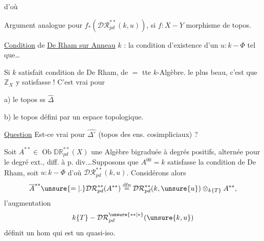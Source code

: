 
d'où

Argument analogue pour $f_*(\mathcal{DR}_{pd}^{**}(k,u))$, si $f:X\mathbin{-}Y$ morphisme de topos.

\uline{Condition} de \uline{De Rham sur Anneau} $k$ : la condition d'existence d'un $u:k\mathbin{-}\Phi$ tel que\ldots

Si $k$ satisfait condition de De Rham, de $=$ tte $k$-Algèbre.  le plus beau, c'est que $\mathbb Z_X$ y satisfasse ! C'est vrai pour

a) le topos ss $\widehat\Delta$

b) le topos défini par un espace topologique. 

\uline{Question} Est-ce vrai pour $\widehat{\Delta^\circ}$ (topos des ens. cosimpliciaux) ? 

Soit $A^{**}\in\operatorname{Ob}\mathbb{DR}_{pd}^{**}(X)$ une Algèbre bigraduée à degrés positifs, alternée pour le degré ext., diff. à p. div.\ldots Supposons que $A^{00}=k$ satisfasse la condition de De Rham, soit $u:k\mathbin{-}\Phi$ d'où $\mathcal{DR}_{pd}^{**}(k,u)$. Considérons alors
\[
\overline A^{**}\unsure{=|.}\mathcal{DR}_{pd}^{**}(A^{**})
\overset{\mathrm{dfn}}=
\mathcal{DR}_{pd}^{**}(k,\unsure{u})\otimes_{k\{T\}}A^{**},
\]
l'augmentation
\[
k\{T\}\mathbin{-}\mathcal{DR}_{pd}^{\unsure{**|*}}(\unsure{k,u})
\]
définit un hom
qui est un quasi-iso.

